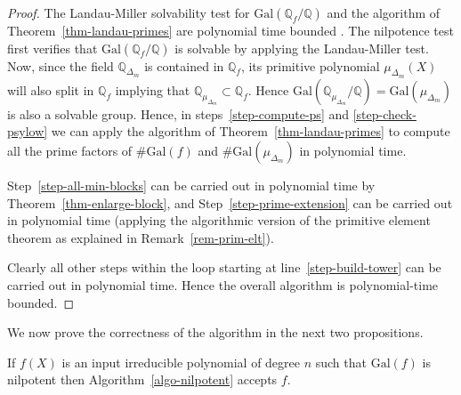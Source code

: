 \documentclass[prodmod,acmtalg]{acmsmall}
\newcommand{\Gal}[1]{{\ensuremath{\mathrm{Gal}\left(#1\right)}}}
\newcommand{\Q}{\ensuremath{\mathbb{Q}}}
\begin{document}
\begin{proof}
The Landau-Miller solvability test for $\Gal{\Q_f/\Q}$ and the
algorithm of Theorem~\ref{thm-landau-primes} are polynomial time
bounded \cite{landau85solvability}. The nilpotence test first verifies
that $\Gal{\Q_f/\Q}$ is solvable by applying the Landau-Miller test.
Now, since the field $\Q_{\Delta_m}$ is contained in $\Q_f$, its
primitive polynomial $\mu_{\Delta_m}(X)$ will also split in $\Q_f$
implying that $\Q_{\mu_{\Delta_m}} \subset \Q_f$. Hence
$\Gal{\Q_{\mu_{\Delta_m}}/\Q}=\Gal{\mu_{\Delta_m}}$ is also a solvable
group. Hence, in steps~\ref{step-compute-ps} and
\ref{step-check-psylow} we can apply the algorithm of
Theorem~\ref{thm-landau-primes} to compute all the prime factors of
$\# \Gal{f}$ and $\# \Gal{\mu_{\Delta_m}}$ in polynomial time.

Step~\ref{step-all-min-blocks} can be carried out in polynomial time
by Theorem~\ref{thm-enlarge-block}, and
Step~\ref{step-prime-extension} can be carried out in polynomial time
(applying the algorithmic version of the primitive element theorem as
explained in Remark~\ref{rem-prim-elt}).

Clearly all other steps within the loop starting at
line~\ref{step-build-tower} can be carried out in polynomial
time. Hence the overall algorithm is polynomial-time bounded.
\end{proof}

We now prove the correctness of the algorithm in the next two
propositions.

\begin{proposition}\label{prop-nilpotent-accepts}
  If $f(X)$ is an input irreducible polynomial of degree $n$ such that
  $\Gal{f}$ is nilpotent then Algorithm~\ref{algo-nilpotent} accepts
  $f$.
\end{proposition}
\end{document}
